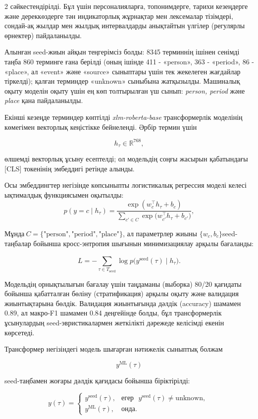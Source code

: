 \begin{multicols}{2}
сәйкестендірілді. Бұл үшін персоналияларға, топонимдерге, тарихи
кезеңдерге және дереккөздерге тән индикаторлық жұрнақтар мен лексемалар
тізімдері, сондай-ақ жылдар мен жылдық интервалдарды анықтайтын үлгілер
(регулярлы өрнектер) пайдаланылды.

Алынған seed-жиын айқын теңгерімсіз болды: 8345 терминнің ішінен сенімді
таңба 860 терминге ғана берілді (оның ішінде 411 - «person», 363 -
«period», 86 - «place», ал «event» және «source» сыныптары үшін тек
жекелеген жағдайлар тіркелді); қалған терминдер «unknown» сыныбына
жатқызылды. Машиналық оқыту моделін оқыту үшін ең көп толтырылған үш
сынып: \emph{person, period} және \emph{place} қана пайдаланылды.

Екінші кезеңде терминдер көптілді \emph{xlm-roberta-base} трансформерлік
моделінің көмегімен векторлық кеңістікке бейнеленді. Әрбір термин үшін

\[h_{\tau} \in \mathbb{R}^{768},\]

өлшемді векторлық ұсыну есептелді; ол модельдің соңғы жасырын
қабатындағы {[}CLS{]} токенінің эмбеддигі ретінде алынды.

Осы эмбеддингтер негізінде көпсыныпты логистикалық регрессия моделі
келесі ықтималдық функциясымен оқытылды:
\vspace{-0.2em}
\[p(y = c \mid h_{\tau}) = \frac{\exp(w_{c}^{\top}h_{\tau} + b_{c})}{\sum_{c'\in C}^{}{\exp(}w_{c'}^{\top}h_{\tau} + b_{c'})},\]

Мұнда\(\ C = \{\text{"person"},\text{"period"},\text{"place"}\}\), ал
параметрлер жиыны \(\{ w_{c},b_{c}\}\)seed-таңбалар бойынша
кросс-энтропия шығынын минимизациялау арқылы бағаланды:

\[L = -\sum_{\tau \in T_{\text{seed}}}^{}{\log p(}y^{\text{seed}}(\tau) \mid h_{\tau}).\]

Модельдің орнықтылығын бағалау үшін таңдаманы (выборка) 80/20 қағидаты
бойынша қабатталған бөліну (стратификация) арқылы оқыту және валидация
жиынтықтарына бөлдік. Валидация жиынтығында дәлдік (accuracy) шамамен
0.89, ал макро-F1 шамамен 0.84 деңгейінде болды, бұл трансформерлік
ұсынулардың seed-эвристикалармен жеткілікті дәрежеде келісімді екенін
көрсетеді.

Трансформер негізіндегі модель шығарған нәтижелік сыныптық болжам

\[y^{\text{ML}}(\tau)\]

seed-таңбамен жоғары дәлдік қағидасы бойынша біріктірілді:

\[y(\tau) = \left\{ \begin{matrix}
y^{\text{seed}}(\tau), & \text{егер}\text{ }y^{\text{seed}}(\tau) \neq \text{unknown}, \\
y^{\text{ML}}(\tau), & \text{онда}.
\end{matrix} \right.\ \]


\end{multicols}
